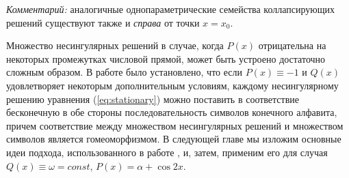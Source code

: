 {\it Комментарий:} аналогичные однопараметрические семейства коллапсирующих решений существуют также и {\it справа} от точки $x = x_0$.

Множество несингулярных решений в случае, когда $P(x)$ отрицательна на некоторых промежутках числовой прямой, может быть устроено достаточно сложным образом.
В работе \cite{AlfAvr} было установлено, что если $P(x) \equiv -1$ и $Q(x)$ удовлетворяет некоторым дополнительным условиям, каждому несингулярному решению уравнения (\ref{eq:stationary}) можно поставить в соответствие бесконечную в обе стороны последовательность символов конечного алфавита, причем соответствие между множеством несингулярных решений и множеством символов является гомеоморфизмом.
В следующей главе мы изложим основные идеи подхода, использованного в работе \cite{AlfAvr}, и, затем, применим его для случая $Q(x) \equiv \omega = const$, $P(x) = \alpha + \cos 2x$.